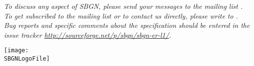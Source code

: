 \begin{titlepage}
\begin{center}
\vfill

\normalsize
\begin{minipage}{5in}
  \emph{To discuss any aspect of SBGN, please send your messages
    to the mailing list .  To get
    subscribed to the mailing list or to contact us directly,
    please write to . Bug reports and specific comments about the specification should be entered in the issue tracker \url{http://sourceforge.net/p/sbgn/sbgn-er-l1/}.}
\end{minipage}

\vfill


\centerline{\texttt{[image: \\SBGNLogoFile]}}


\end{center}

\end{titlepage}

%
%

\setcounter{page}{2}

